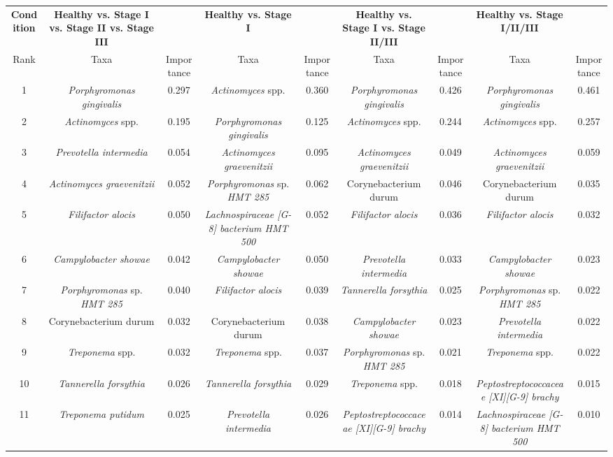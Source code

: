 \begin{tabular}{c|cc|cc|cc|cc}
    \textbf{Condition} & \textbf{Healthy vs. Stage I vs. Stage II vs. Stage III} & & \textbf{Healthy vs. Stage I} & & \textbf{Healthy vs. Stage I vs. Stage II/III} & & \textbf{Healthy vs. Stage I/II/III} & \\
    Rank & Taxa & Importance & Taxa & Importance & Taxa & Importance & Taxa & Importance \\
    \hline
    1 & \textit{Porphyromonas gingivalis} & 0.297 & \textit{Actinomyces} spp. & 0.360 & \textit{Porphyromonas gingivalis} & 0.426 & \textit{Porphyromonas gingivalis} & 0.461 \\
    2 & \textit{Actinomyces} spp. & 0.195 & \textit{Porphyromonas gingivalis} & 0.125 & \textit{Actinomyces} spp. & 0.244 & \textit{Actinomyces} spp. & 0.257 \\
    3 & \textit{Prevotella intermedia} & 0.054 & \textit{Actinomyces graevenitzii} & 0.095 & \textit{Actinomyces graevenitzii} & 0.049 & \textit{Actinomyces graevenitzii} & 0.059 \\
    4 & \textit{Actinomyces graevenitzii} & 0.052 & \textit{Porphyromonas} sp. \textit{HMT 285} & 0.062 & Corynebacterium durum & 0.046 & Corynebacterium durum & 0.035 \\
    5 & \textit{Filifactor alocis} & 0.050 & \textit{Lachnospiraceae [G-8] bacterium HMT 500} & 0.052 & \textit{Filifactor alocis} & 0.036 & \textit{Filifactor alocis} & 0.032 \\
    6 & \textit{Campylobacter showae} & 0.042 & \textit{Campylobacter showae} & 0.050 & \textit{Prevotella intermedia} & 0.033 & \textit{Campylobacter showae} & 0.023 \\
    7 & \textit{Porphyromonas} sp. \textit{HMT 285} & 0.040 & \textit{Filifactor alocis} & 0.039 & \textit{Tannerella forsythia} & 0.025 & \textit{Porphyromonas} sp. \textit{HMT 285} & 0.022 \\
    8 & Corynebacterium durum & 0.032 & Corynebacterium durum & 0.038 & \textit{Campylobacter showae} & 0.023 & \textit{Prevotella intermedia} & 0.022 \\
    9 & \textit{Treponema} spp. & 0.032 & \textit{Treponema} spp. & 0.037 & \textit{Porphyromonas} sp. \textit{HMT 285} & 0.021 & \textit{Treponema} spp. & 0.022 \\
    10 & \textit{Tannerella forsythia} & 0.026 & \textit{Tannerella forsythia} & 0.029 & \textit{Treponema} spp. & 0.018 & \textit{Peptostreptococcaceae [XI][G-9] brachy} & 0.015 \\
    11 & \textit{Treponema putidum} & 0.025 & \textit{Prevotella intermedia} & 0.026 & \textit{Peptostreptococcaceae [XI][G-9] brachy} & 0.014 & \textit{Lachnospiraceae [G-8] bacterium HMT 500} & 0.010 \\

\end{tabular}
